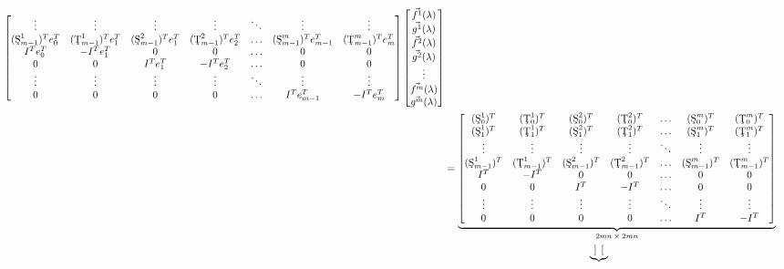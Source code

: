 \documentclass[10pt,reqno,oneside,a4paper]{article}
\begin{document}
\begin{align}
\begin{bmatrix}
\vdots & \vdots & \vdots & \vdots & \ddots & \vdots & \vdots \\
(\textup{\c{S}}^1_{m-1})^T e_{0}^T& (\textup{\c{T}}^1_{m-1})^Te_{1}^T & (\textup{\c{S}}^2_{m-1})^T e_{1}^T& (\textup{\c{T}}^2_{m-1})^T e_{2}^T& \ldots & (\textup{\c{S}}^m_{m-1})^T e_{m-1}^T & (\textup{\c{T}}^m_{m-1})^T e_{m}^T \\
I^T e_{0}^T & -I^Te_1^T & 0 & 0 & \ldots & 0 & 0  \\
0 & 0 & I^T e_{1}^T & -I^Te_2^T & \ldots & 0 & 0  \\
\vdots & \vdots & \vdots &  \vdots & \ddots & \vdots & \vdots \\
0 & 0 & 0 & 0 & \ldots & I^Te_{m-1}^T & -I^Te_{m}^T 
\end{bmatrix}
\begin{bmatrix}
\vec{f^1}(\lambda) \\ \vec{g^1}(\lambda) \\
\vec{f^2}(\lambda) \\ \vec{g^2}(\lambda) \\
\vdots \\
\vec{f^m}(\lambda) \\ \vec{g^m}(\lambda) 
\end{bmatrix}& \nonumber \\
&= \underbrace{\begin{bmatrix}
(\textup{\c{S}}^1_0)^T & (\textup{\c{T}}^1_0)^T  & (\textup{\c{S}}^2_0)^T & (\textup{\c{T}}^2_0)^T & \ldots & (\textup{\c{S}}^m_0)^T & (\textup{\c{T}}^m_0)^T \\
(\textup{\c{S}}^1_1)^T &  (\textup{\c{T}}^1_1)^T & (\textup{\c{S}}^2_1)^T & (\textup{\c{T}}^2_1)^T & \ldots  & (\textup{\c{S}}^m_1)^T & (\textup{\c{T}}^m_1)^T \\
\vdots & \vdots & \vdots & \vdots & \ddots & \vdots & \vdots \\
(\textup{\c{S}}^1_{m-1})^T & (\textup{\c{T}}^1_{m-1})^T & (\textup{\c{S}}^2_{m-1})^T & (\textup{\c{T}}^2_{m-1})^T & \ldots & (\textup{\c{S}}^m_{m-1})^T & (\textup{\c{T}}^m_{m-1})^T \\
I^T & -I^T & 0 & 0 & \ldots & 0 & 0  \\
0 & 0 & I^T & -I^T & \ldots & 0 & 0  \\
\vdots & \vdots & \vdots &  \vdots & \ddots & \vdots & \vdots \\
0 & 0 & 0 & 0 & \ldots & I^T & -I^T
\end{bmatrix}}_\text{$2mn\times 2mn$}& \nonumber \\
&\hspace{5cm}\underbrace{\begin{bmatrix}

\end{bmatrix}}
\end{align}
\end{document}
